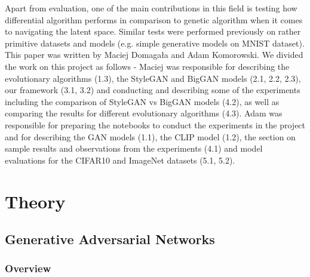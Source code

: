 \documentclass[11pt,a4paper,openany]{book}
\begin{document}
\noindent Apart from evaluation,  one of the main contributions in this field is testing how differential algorithm performs in comparison to genetic algorithm when it comes to navigating the latent space. Similar tests were performed previously on rather primitive datasets and models (e.g.  simple generative models on MNIST dataset). \\
\noindent This paper was written by Maciej Domagała and Adam Komorowski.  We divided the work on this project as follows - Maciej was responsible for describing the evolutionary algorithms (1.3), the StyleGAN and BigGAN models (2.1, 2.2, 2.3),  our framework (3.1, 3.2) and conducting and describing some of the experiments including the comparison of StyleGAN vs BigGAN models (4.2),  as well as comparing the results for different evolutionary algorithms (4.3).  Adam was responsible for preparing the notebooks to conduct the experiments in the project and for describing the GAN models (1.1), the CLIP model (1.2), the section on sample results and observations from the experiments (4.1) and model evaluations for the CIFAR10 and ImageNet datasets (5.1, 5.2).


\chapter{Theory}

\section{Generative Adversarial Networks}


\subsection{Overview}
\end{document}
